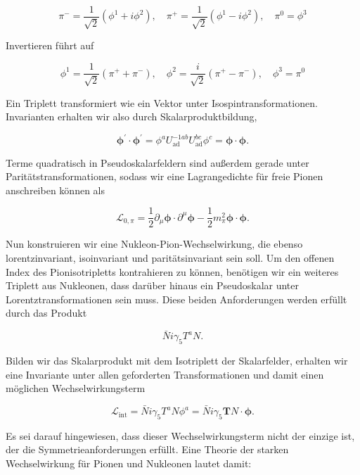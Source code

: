\documentclass[10pt, letterpaper]{article}
\begin{document}
$$
\pi^{-}=\frac{1}{\sqrt{2}}\left(\phi^{1}+i \phi^{2}\right), \quad \pi^{+}=\frac{1}{\sqrt{2}}\left(\phi^{1}-i \phi^{2}\right), \quad \pi^{0}=\phi^{3}
$$

Invertieren führt auf

$$
\phi^{1}=\frac{1}{\sqrt{2}}\left(\pi^{+}+\pi^{-}\right), \quad \phi^{2}=\frac{i}{\sqrt{2}}\left(\pi^{+}-\pi^{-}\right), \quad \phi^{3}=\pi^{0}
$$

Ein Triplett transformiert wie ein Vektor unter Isospintransformationen. Invarianten erhalten wir also durch Skalarproduktbildung,

$$
\boldsymbol{\phi}^{\prime} \cdot \boldsymbol{\phi}^{\prime}=\phi^{a} U_{\mathrm{ad}}^{-1 a b} U_{\mathrm{ad}}^{b c} \phi^{c}=\boldsymbol{\phi} \cdot \boldsymbol{\phi} .
$$

Terme quadratisch in Pseudoskalarfeldern sind außerdem gerade unter Paritätstransformationen, sodass wir eine Lagrangedichte für freie Pionen anschreiben können als

$$
\mathscr{L}_{0, \pi}=\frac{1}{2} \partial_{\mu} \boldsymbol{\phi} \cdot \partial^{\mu} \boldsymbol{\phi}-\frac{1}{2} m_{\pi}^{2} \boldsymbol{\phi} \cdot \boldsymbol{\phi} .
$$

Nun konstruieren wir eine Nukleon-Pion-Wechselwirkung, die ebenso lorentzinvariant, isoinvariant und paritätsinvariant sein soll. Um den offenen Index des Pionisotripletts kontrahieren zu können, benötigen wir ein weiteres Triplett aus Nukleonen, dass darüber hinaus ein Pseudoskalar unter Lorentztransformationen sein muss. Diese beiden Anforderungen werden erfüllt durch das Produkt

$$
\bar{N} i \gamma_{5} T^{a} N .
$$

Bilden wir das Skalarprodukt mit dem Isotriplett der Skalarfelder, erhalten wir eine Invariante unter allen geforderten Transformationen und damit einen möglichen Wechselwirkungsterm

$$
\mathscr{L}_{\mathrm{int}}=\bar{N} i \gamma_{5} T^{a} N \phi^{a}=\bar{N} i \gamma_{5} \boldsymbol{T} N \cdot \boldsymbol{\phi} .
$$

Es sei darauf hingewiesen, dass dieser Wechselwirkungsterm nicht der einzige ist, der die Symmetrieanforderungen erfüllt. Eine Theorie der starken Wechselwirkung für Pionen und Nukleonen lautet damit:
\end{document}
